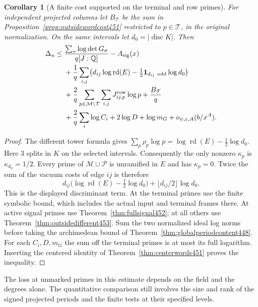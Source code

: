 \documentclass[a4paper,11pt]{article}
\newtheorem{corollary}[proposition]{Corollary}
\theoremstyle{definition}
\theoremstyle{remark}
\numberwithin{equation}{section}
\begin{document}
\begin{corollary}[A finite cost supported on the terminal and row primes]\leavevmode
\label{cor:outsidecenter453}
For independent projected columns let \(B_\mathcal T\) be the
sum in Proposition~\ref{prop:outsidewordcost451} restricted
to \(p\in\mathcal T\), in the original normalization. On the
same intervals let \(d_0=|\operatorname{disc}K|\). Then
\[
\begin{split}
 \Delta_u\le{}&
  \frac{\sum_\sigma\log\det G_\sigma}{q[J:\mathbb Q]}-A_{\rm sig}(x)\\
 &+\frac1q\sum_{i,j}\!
  \left(d_{ij}\log\operatorname{rd}(E)
       -\tfrac12{\bf1}_{d_{ij}\ {\rm odd}}\log d_0\right)\\
 &+\frac2q\sum_{p\in\mathcal M\setminus\mathcal T}
                \sum_{i,j}J_{ij,p}^{\rm row}\log p
     +\frac{B_\mathcal T}{q}\\
 &+\frac2q\sum_i\log C_i+2\log D+\log m_G+
                            o_{\psi,\varepsilon,A}(b/x^A).
\end{split}
\]
\end{corollary}
\begin{proof}
The different tower formula gives
\(\sum_p\rho_p\log p=\log\operatorname{rd}(E)-\tfrac12\log d_0\).
Here \(3\) splits in \(K\) on the selected intervals.
Consequently the only nonzero \(\kappa_p\) is \(\kappa_{d_0}=1/2\).
Every prime of \(\mathcal M\cup\mathcal P\) is unramified
in \(E\) and has \(\kappa_p=0\). Twice the sum of the vacuum
costs of edge \(ij\) is therefore
\[
 d_{ij}\big(\log\operatorname{rd}(E)-\tfrac12\log d_0\big)
                      +\lfloor d_{ij}/2\rfloor\log d_0 .
\]
This is the displayed discriminant term. At the terminal primes
use the finite symbolic bound, which includes the actual input
and terminal frames there. At active signal primes use
Theorem~\ref{thm:fullsignal452}; at all others use
Theorem~\ref{thm:outsidedifferent453}. Sum the two normalized
ideal log norms before taking the archimedean bound of
Theorem~\ref{thm:globalperiodcontent448}. For each
\(C_i,D,m_G\) the sum off the terminal primes is at most its
full logarithm. Inserting the centered identity of
Theorem~\ref{thm:centerwords451} proves the inequality.
\end{proof}

The loss at unmarked primes in this estimate depends on the
field and the degrees alone. The quantitative comparison still
involves the size and rank of the signed projected periods and
the finite tests at their specified levels.
\end{document}
